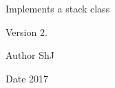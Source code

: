 Implements a stack class

\begin{DoxyVersion}{Version}
2.
\end{DoxyVersion}
\begin{DoxyAuthor}{Author}
ShJ 
\end{DoxyAuthor}
\begin{DoxyDate}{Date}
2017 
\end{DoxyDate}
